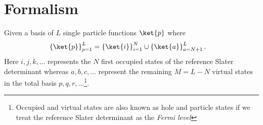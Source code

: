\chapter{Formalism}
    Given a basis of $L$ single particle functions $\ket{p}$ where
    \begin{align}
        \left\{\ket{p}\right\}_{p = 1}^{L}
        &=
        \left\{\ket{i}\right\}_{i = 1}^{N}
        \cup \left\{\ket{a}\right\}_{a = N + 1}^{L}.
    \end{align}
    Here $i, j, k, \dots$ represents the $N$ first occupied states of the
    reference Slater determinant whereas $a, b, c, \dots$ represent the
    remaining $M = L - N$ virtual states in the total basis $p, q, r,
    \dots$\footnote{Occupied and virtual states are also known as hole and
    particle states if we treat the reference Slater determinant as the
    \textit{Fermi level}}.
